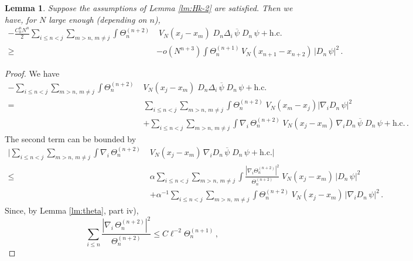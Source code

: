 \documentclass[11pt]{article}
\newtheorem{lemma}[theorem]{Lemma}
\renewcommand{\a}{\alpha}
\begin{document}
\begin{lemma}\label{lm:Hk-2-2}
Suppose the assumptions of Lemma \ref{lm:Hk-2} are satisfied. Then
we have, for $N$ large enough (depending on $n$),
\begin{equation}\label{eq:lmHk-2-2}
\begin{split}
- \frac{C_0^n N^n}{2} \sum_{i\leq n < j} \sum_{m >n, \, m \neq j}
\int \Theta^{(n+2)}_n &\; V_N (x_j -x_m)\; D_n \Delta_i \,
\overline{\psi}
\; D_n \, \psi + \text{h.c.} \\
\geq \; &-o(N^{n+3}) \int \Theta^{(n+1)}_n \, V_N (x_{n+1}
-x_{n+2})\, |D_n \, \psi|^2\,.
\end{split}
\end{equation}
\end{lemma}

\begin{proof}
We have
\begin{equation}\label{eq:Hk-5-1a}
\begin{split}
-  \sum_{i\leq n < j} \sum_{m >n, \, m \neq j} \int \Theta^{(n+2)}_n
\; & V_N (x_j -x_m) \; D_n \Delta_i \,
\overline{\psi} \; D_n \, \psi +\text{h.c.} \\
= \; &\sum_{i\leq n < j} \sum_{m >n, \, m \neq j} \int
\Theta^{(n+2)}_n \;
V_N (x_m - x_j) |\nabla_i D_n \, \psi|^2\\
&+  \sum_{i\leq n < j} \sum_{m >n, \, m \neq j} \int \nabla_i \,
\Theta^{(n+2)}_n \; V_N (x_j -x_m)\, \nabla_i D_n \, \overline{\psi}
\; D_n \, \psi +\text{h.c.} \,.
\end{split}
\end{equation}
The second term can be bounded by
\begin{equation}\label{eq:Hk-5-2}
\begin{split}
\Big|\sum_{i\leq n < j} \sum_{m >n, \, m \neq j} \int \nabla_i \,
\Theta^{(n+2)}_n \; &V_N (x_j -x_m)\, \nabla_i D_n \,
\overline{\psi} \; D_n \, \psi +\text{h.c.} \Big| \\  \leq \;& \a
\sum_{i\leq n < j} \sum_{m >n , \, m\neq j} \int \frac{|\nabla_i
\Theta^{(n+2)}_n|^2}{\Theta^{(n+2)}_n}  \; V_N (x_j -x_m)\, |D_n \,
\psi|^2  \\ &+ \a^{-1} \sum_{i\leq n < j} \sum_{m >n, \, m \neq j}
\int \Theta^{(n+2)}_n \; V_N (x_j -x_m)\, |\nabla_i D_n \,\psi|^2
\,.
\end{split}
\end{equation}
Since, by Lemma \ref{lm:theta}, part iv),
\begin{equation}
\sum_{i \leq n} \frac{|\nabla_i \, \Theta^{(n+2)}_n
|^2}{\Theta_n^{(n+2)}} \leq C \ell^{-2} \Theta^{(n+1)}_{n}\,,

\end{equation}
\end{proof}
\end{document}
